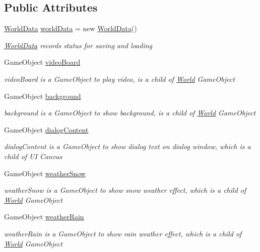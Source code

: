 \subsection*{Public Attributes}
\begin{DoxyCompactItemize}
\item 
\hyperlink{class_world_data}{World\+Data} \hyperlink{class_world_a1fbe122911090d8260c2adb3154948e9}{world\+Data} = new \hyperlink{class_world_data}{World\+Data}()
\begin{DoxyCompactList}\small\item\em \hyperlink{class_world_data}{World\+Data} records status for saving and loading \end{DoxyCompactList}\item 
Game\+Object \hyperlink{class_world_a3f5611886c86b79c1c3859bb22d9188c}{video\+Board}
\begin{DoxyCompactList}\small\item\em video\+Board is a Game\+Object to play video, is a child of \hyperlink{class_world}{World} Game\+Object \end{DoxyCompactList}\item 
Game\+Object \hyperlink{class_world_a3612dc0a0f19a942ee02d2868b364904}{background}
\begin{DoxyCompactList}\small\item\em background is a Game\+Object to show background, is a child of \hyperlink{class_world}{World} Game\+Object \end{DoxyCompactList}\item 
Game\+Object \hyperlink{class_world_a9a36c5ca7478a1f3085abe105b0aaad7}{dialog\+Content}
\begin{DoxyCompactList}\small\item\em dialog\+Content is a Game\+Object to show dialog text on dialog window, which is a child of UI Canvas \end{DoxyCompactList}\item 
Game\+Object \hyperlink{class_world_a1cc76aaa480d30c16705ffc0516ff388}{weather\+Snow}
\begin{DoxyCompactList}\small\item\em weather\+Snow is a Game\+Object to show snow weather effect, which is a child of \hyperlink{class_world}{World} Game\+Object \end{DoxyCompactList}\item 
Game\+Object \hyperlink{class_world_a1b9a3cfed2eb973bb14d5c66d701ee9a}{weather\+Rain}
\begin{DoxyCompactList}\small\item\em weather\+Rain is a Game\+Object to show rain weather effect, which is a child of \hyperlink{class_world}{World} Game\+Object \end{DoxyCompactList}\end{DoxyCompactItemize}



